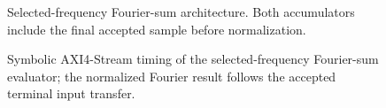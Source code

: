 \begin{figure}[H]
\begin{center}
\resizebox{\textwidth}{!}{}
\caption{Selected-frequency Fourier-sum architecture. Both accumulators include the final accepted sample before normalization.}
\label{fig:dft}
\end{center}
\end{figure}

\begin{figure}[H]
\begin{center}
\resizebox{0.96\textwidth}{!}{}
\caption{Symbolic AXI4-Stream timing of the selected-frequency Fourier-sum evaluator; the normalized Fourier result follows the accepted terminal input transfer.}
\label{fig:6_DFT}
\end{center}
\end{figure}

